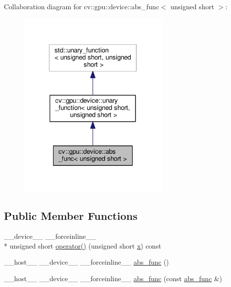 Collaboration diagram for cv\-:\-:gpu\-:\-:device\-:\-:abs\-\_\-func$<$ unsigned short $>$\-:\nopagebreak
\begin{figure}[H]
\begin{center}
\leavevmode
\includegraphics[width=214pt]{structcv_1_1gpu_1_1device_1_1abs__func_3_01unsigned_01short_01_4__coll__graph}
\end{center}
\end{figure}
\subsection*{Public Member Functions}
\begin{DoxyCompactItemize}
\item 
\-\_\-\-\_\-device\-\_\-\-\_\- \-\_\-\-\_\-forceinline\-\_\-\-\_\- \\*
unsigned short \hyperlink{structcv_1_1gpu_1_1device_1_1abs__func_3_01unsigned_01short_01_4_a99f458027ee4f93f33a5d783d8f7c37b}{operator()} (unsigned short \hyperlink{highgui__c_8h_a6150e0515f7202e2fb518f7206ed97dc}{x}) const 
\item 
\-\_\-\-\_\-host\-\_\-\-\_\- \-\_\-\-\_\-device\-\_\-\-\_\- \-\_\-\-\_\-forceinline\-\_\-\-\_\- \hyperlink{structcv_1_1gpu_1_1device_1_1abs__func_3_01unsigned_01short_01_4_a717d4394f6c3708f32109d9059740f39}{abs\-\_\-func} ()
\item 
\-\_\-\-\_\-host\-\_\-\-\_\- \-\_\-\-\_\-device\-\_\-\-\_\- \-\_\-\-\_\-forceinline\-\_\-\-\_\- \hyperlink{structcv_1_1gpu_1_1device_1_1abs__func_3_01unsigned_01short_01_4_ad2b2ad9adfa5528b3bb9b1460d260f8e}{abs\-\_\-func} (const \hyperlink{structcv_1_1gpu_1_1device_1_1abs__func}{abs\-\_\-func} \&)
\end{DoxyCompactItemize}


